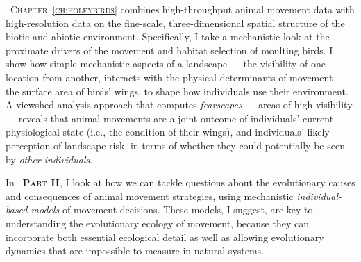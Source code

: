 {\scshape~Chapter~\ref{ch:holeybirds}} combines high-throughput animal movement data with high-resolution data on the fine-scale, three-dimensional spatial structure of the biotic and abiotic environment.
Specifically, I take a mechanistic look at the proximate drivers of the movement and habitat selection of moulting birds.
I show how simple mechanistic aspects of a landscape --- the visibility of one location from another, interacts with the physical determinants of movement --- the surface area of birds' wings, to shape how individuals use their environment.
A viewshed analysis approach that computes \textit{fearscapes} --- areas of high visibility --- reveals that animal movements are a joint outcome of individuals' current physiological state (i.e., the condition of their wings), and individuals' likely perception of landscape risk, in terms of whether they could potentially be seen by \textit{other individuals}.


\medskip

\noindent In {\scshape~\textbf{Part II}}, I look at how we can tackle questions about the evolutionary causes and consequences of animal movement strategies, using mechanistic \textit{individual-based models} of movement decisions.
These models, I suggest, are key to understanding the evolutionary ecology of movement, because they can incorporate both essential ecological detail as well as allowing evolutionary dynamics that are impossible to measure in natural systems.

\medskip

